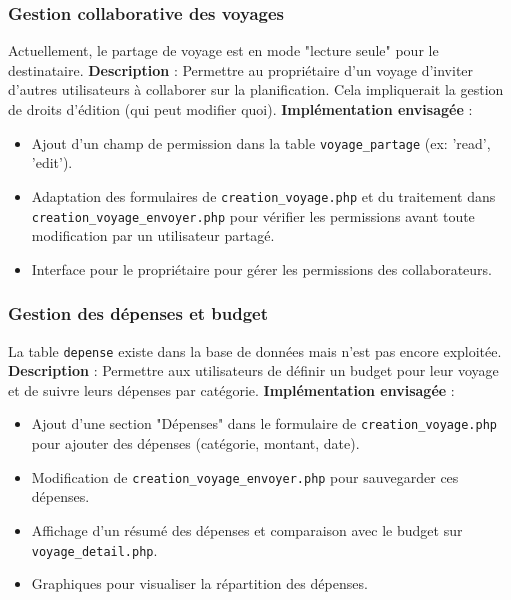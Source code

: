 \documentclass[a4paper,12pt]{article}
\begin{document}
\subsubsection{Gestion collaborative des voyages}
Actuellement, le partage de voyage est en mode "lecture seule" pour le destinataire.
\textbf{Description} : Permettre au propriétaire d'un voyage d'inviter d'autres utilisateurs à collaborer sur la planification. Cela impliquerait la gestion de droits d'édition (qui peut modifier quoi).
\textbf{Implémentation envisagée} :
\begin{itemize}
    \item Ajout d'un champ de permission dans la table \texttt{voyage\_partage} (ex: 'read', 'edit').
    \item Adaptation des formulaires de \texttt{creation\_voyage.php} et du traitement dans \texttt{creation\_voyage\_envoyer.php} pour vérifier les permissions avant toute modification par un utilisateur partagé.
    \item Interface pour le propriétaire pour gérer les permissions des collaborateurs.
\end{itemize}

\subsubsection{Gestion des dépenses et budget}
La table \texttt{depense} existe dans la base de données mais n'est pas encore exploitée.
\textbf{Description} : Permettre aux utilisateurs de définir un budget pour leur voyage et de suivre leurs dépenses par catégorie.
\textbf{Implémentation envisagée} :
\begin{itemize}
    \item Ajout d'une section "Dépenses" dans le formulaire de \texttt{creation\_voyage.php} pour ajouter des dépenses (catégorie, montant, date).
    \item Modification de \texttt{creation\_voyage\_envoyer.php} pour sauvegarder ces dépenses.
    \item Affichage d'un résumé des dépenses et comparaison avec le budget sur \texttt{voyage\_detail.php}.
    \item Graphiques pour visualiser la répartition des dépenses.
\end{itemize}
\end{document}
